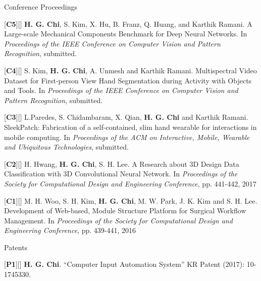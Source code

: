 \begin{cventries}
\cvpub
{Conference Proceedings} %
{ %
\begin{cvitems}
\item {[\textbf{C5}][\href{https://docs.google.com/viewer?url=https://github.com/stnoah1/CV/raw/master/documents/MCB.pdf}{}] \textbf{H. G. Chi}, S. Kim, X. Hu, B. Franz, Q. Huang, and Karthik Ramani. A Large-scale Mechanical Components Benchmark for Deep Neural Networks. In \textit{Proceedings of the IEEE Conference on Computer Vision and Pattern Recognition}, submitted.}
\item {[\textbf{C4}][\href{https://docs.google.com/viewer?url=https://github.com/stnoah1/CV/raw/master/documents/RGBDT.pdf}{}] S. Kim, \textbf{H. G. Chi}, A. Unmesh and Karthik Ramani. Multispectral Video Dataset for First-person View Hand Segmentation during Activity with Objects and Tools. In \textit{Proceedings of the IEEE Conference on Computer Vision and Pattern Recognition}, submitted.}
\item {[\textbf{C3}][\href{https://docs.google.com/viewer?url=https://github.com/stnoah1/CV/raw/master/documents/SleekPatch.pdf}{}] L.Paredes, S. Chidambaram, X. Qian, \textbf{H. G. Chi} and Karthik Ramani. SleekPatch: Fabrication of a self-contained, slim hand wearable for interactions in mobile computing. In \textit{Proceedings of the ACM on Interactive, Mobile, Wearable and Ubiquitous Technologies}, submitted.}
\item {[\textbf{C2}][\href{https://docs.google.com/viewer?url=https://github.com/stnoah1/CV/raw/master/documents/3DM.pdf}{}] H. Hwang, \textbf{H. G. Chi}, S. H. Lee. A Research about 3D Design Data Classification with 3D Convolutional Neural Network. In \textit{Proceedings of the Society for Computational Design and Engineering Conference}, pp. 441-442, 2017}
\item {[\textbf{C1}][\href{https://docs.google.com/viewer?url=https://github.com/stnoah1/CV/raw/master/documents/SWORM.pdf}{}] M. H. Woo, S. H. Kim, \textbf{H. G. Chi}, M. W. Park, J. K. Kim and S. H. Lee. Development of Web-based, Module Structure Platform for Surgical Workflow Management. In \textit{Proceedings of the Society for Computational Design and Engineering Conference}, pp. 439-441, 2016}
\end{cvitems}
}


\cvpub
{Patents}{
\begin{cvitems}
\item {[\textbf{P1}][\href{https://docs.google.com/viewer?url=https://github.com/stnoah1/CV/raw/master/documents/patent.pdf}{}] \textbf{H. G. Chi}.  “Computer Input Automation System” KR Patent (2017): 10-1745330.}
\end{cvitems}
}



\end{cventries}